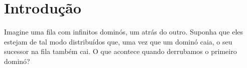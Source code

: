\section{Introdução}

Imagine uma fila com infinitos dominós, um atrás do outro. Suponha que eles estejam de tal modo distribuídos que, uma vez que um dominó
caia, o seu sucessor na fila também cai. O que acontece quando derrubamos o primeiro dominó?